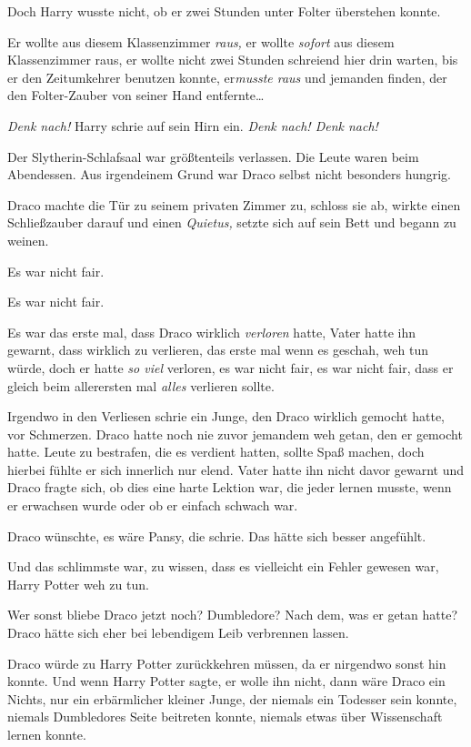 {Doch Harry wusste nicht, ob er zwei Stunden unter Folter überstehen konnte.

Er wollte aus diesem Klassenzimmer \emph{raus,} er wollte \emph{sofort} aus diesem Klassenzimmer raus, er wollte nicht zwei Stunden schreiend hier drin warten, bis er den Zeitumkehrer benutzen konnte, er\emph{musste raus} und jemanden finden, der den Folter-Zauber von seiner Hand entfernte…

\emph{Denk nach!} Harry schrie auf sein Hirn ein. \emph{Denk nach! Denk nach!}

\later

Der Slytherin-Schlafsaal war größtenteils verlassen. Die Leute waren beim Abendessen. Aus irgendeinem Grund war Draco selbst nicht besonders hungrig.

Draco machte die Tür zu seinem privaten Zimmer zu, schloss sie ab, wirkte einen Schließzauber darauf und einen \emph{Quietus,} setzte sich auf sein Bett und begann zu weinen.

Es war nicht fair.

Es war nicht fair.

Es war das erste mal, dass Draco wirklich \emph{verloren} hatte, Vater hatte ihn gewarnt, dass wirklich zu verlieren, das erste mal wenn es geschah, weh tun würde, doch er hatte \emph{so viel} verloren, es war nicht fair, es war nicht fair, dass er gleich beim allerersten mal \emph{alles} verlieren sollte.

Irgendwo in den Verliesen schrie ein Junge, den Draco wirklich gemocht hatte, vor Schmerzen. Draco hatte noch nie zuvor jemandem weh getan, den er gemocht hatte. Leute zu bestrafen, die es verdient hatten, sollte Spaß machen, doch hierbei fühlte er sich innerlich nur elend. Vater hatte ihn nicht davor gewarnt und Draco fragte sich, ob dies eine harte Lektion war, die jeder lernen musste, wenn er erwachsen wurde oder ob er einfach schwach war.

Draco wünschte, es wäre Pansy, die schrie. Das hätte sich besser angefühlt.

Und das schlimmste war, zu wissen, dass es vielleicht ein Fehler gewesen war, Harry Potter weh zu tun.

Wer sonst bliebe Draco jetzt noch? Dumbledore? Nach dem, was er getan hatte? Draco hätte sich eher bei lebendigem Leib verbrennen lassen.

Draco würde zu Harry Potter zurückkehren müssen, da er nirgendwo sonst hin konnte. Und wenn Harry Potter sagte, er wolle ihn nicht, dann wäre Draco ein Nichts, nur ein erbärmlicher kleiner Junge, der niemals ein Todesser sein konnte, niemals Dumbledores Seite beitreten konnte, niemals etwas über Wissenschaft lernen konnte.

}
